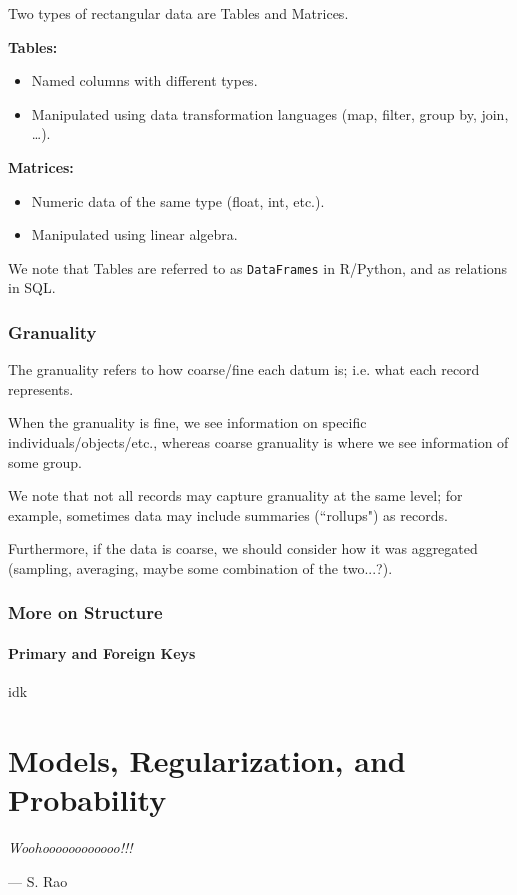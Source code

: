 \documentclass[openany]{book}
\begin{document}
Two types of rectangular data are Tables and Matrices.
\begin{paracol}{2}
	\textbf{Tables:}
	\begin{itemize}
		\item Named columns with different types.
		\item Manipulated using data transformation languages (map, filter, group by, join, …).
	\end{itemize}
	\switchcolumn
	\textbf{Matrices:}
	\begin{itemize}
		\item Numeric data of the same type (float, int, etc.).
		\item Manipulated using linear algebra.
	\end{itemize}
\end{paracol}
\begin{rmk}
	We note that Tables are referred to as \texttt{DataFrames} in R/Python, and as relations in SQL.
\end{rmk}

\subsection{Granuality}
\begin{defn}[Granuality]
	The granuality refers to how coarse/fine each datum is; i.e. what each record represents.
	
	When the granuality is fine, we see information on specific individuals/objects/etc., whereas coarse granuality is where we see information of some group.
\end{defn}

We note that not all records may capture granuality at the same level; for example, sometimes data may include summaries (``rollups") as records.

Furthermore, if the data is coarse, we should consider how it was aggregated (sampling, averaging, maybe some combination of the two...?).

\subsection{More on Structure}
\subsubsection{Primary and Foreign Keys}
idk

\chapter{Models, Regularization, and Probability}
\epigraph{\textit{Woohoooooooooooo!!!}}{--- S. Rao}
\end{document}
